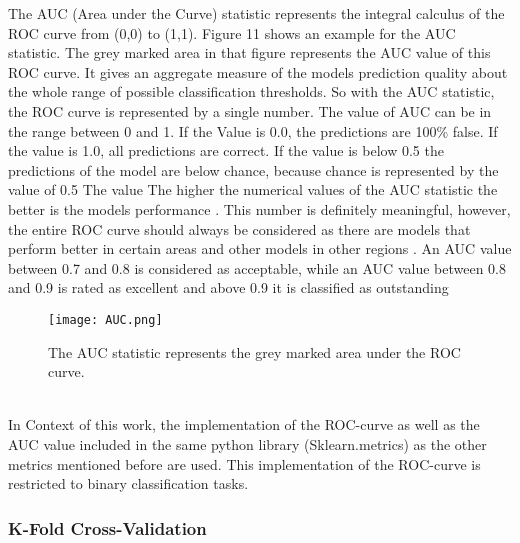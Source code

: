 \documentclass[../masterarbeit.tex]{subfiles}
\begin{document}
The AUC (Area under the Curve) statistic represents the integral calculus of the ROC curve from (0,0) to (1,1). Figure 11 shows an example for the AUC statistic. The grey marked area in that figure represents the AUC value of this ROC curve. It gives an aggregate measure of the models prediction quality about the whole range of possible classification thresholds. So with the AUC statistic, the ROC curve is represented by a single number. The value of AUC can be in the range between 0 and 1. If the Value is 0.0, the predictions are 100\% false. If the value is 1.0, all predictions are correct. If the value is below 0.5 the predictions of the model are below chance, because chance is represented by the value of 0.5 \autocites[]{Google_ROC_AUC:2022, analyticsvidhya_evaluation:2022} The value The higher the numerical values of the AUC statistic the better is the models performance \textcite[]{analyticsvidhya_evaluation:2022}. This number is definitely meaningful, however, the entire ROC curve should always be considered as there are models that perform better in certain areas and other models in other regions \textcite[]{analyticsvidhya_evaluation:2022}. 
An AUC value between 0.7 and 0.8 is considered as acceptable, while an AUC value between 0.8 and 0.9 is rated as excellent and above 0.9 it is classified as outstanding \textcite[]{MANDREKAR20101315}\\




\begin{figure}[h]
    \centering
    \texttt{[image: AUC.png]}
    \caption{The AUC statistic represents the grey marked area under the ROC curve.}
\end{figure} \\

In Context of this work, the implementation of the ROC-curve as well as the AUC value included in the same python library (Sklearn.metrics) as the other metrics mentioned before are used. This implementation of the ROC-curve is restricted to binary classification tasks. \autocite[]{Scikit-learn-roc-curve:2022}



\subsubsection{K-Fold Cross-Validation}
\end{document}
